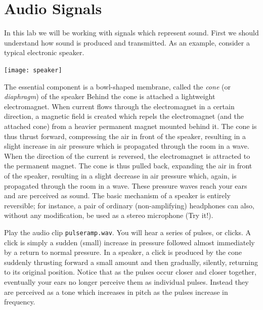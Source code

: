 
\def\x{{\bf x}}
\def\q{{\bf q}}
\def\p{{\bf p}}
\def\v{{\bf v}}


\section*{Audio Signals}

In this lab we will be working with signals which represent sound.
First we should understand how sound is produced and transmitted.
As an example, consider a typical electronic speaker.

\begin{center}\texttt{[image: speaker]}\end{center}

The essential component is a bowl-shaped membrane, called the \emph{cone} (or \emph{diaphragm}) of the speaker
 Behind the cone is attached a lightweight electromagnet.
 When current flows through the electromagnet in a certain direction, a magnetic field is created which repels the electromagnet (and the attached cone) from a  heavier permanent magnet mounted behind it.
 The cone is thus thrust forward, compressing the air in front of the speaker, resulting in a slight increase in air pressure which is propagated through the room in a wave.
 When the direction of the current is reversed, the electromagnet is attracted to the permanent magnet.
 The cone is thus pulled back, expanding the air in front of the speaker, resulting in a slight decrease in air pressure which, again, is propagated through the room in a wave.
 These pressure waves reach your ears and are perceived as sound.
 The basic mechanism of a speaker is entirely reversible; for instance, a pair of ordinary (non-amplifying) headphones can also, without any modification, be used as a stereo microphone (Try it!).

Play the audio clip \texttt{pulseramp.wav}.
You will hear a series of pulses, or clicks.
A click is simply a sudden (small) increase in pressure followed almost immediately by a return to normal pressure.
In a speaker, a click is produced by the cone suddenly thrusting forward a small amount and then gradually, silently, returning to its original position.
Notice that as the pulses occur closer and closer together, eventually your ears no longer perceive them as individual pulses.
Instead they are perceived as a tone which increases in pitch as the pulses increase in frequency.

